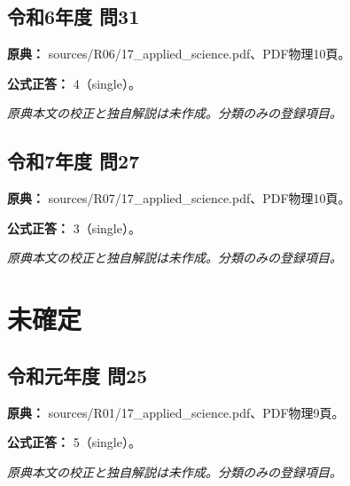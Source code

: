 \subsection{令和6年度 問31}
\label{q:r06-reg-applied-31}

\noindent\textbf{原典：} sources/R06/17\_applied\_science.pdf、PDF物理10頁。

\textbf{公式正答：} 4（single）。

\par\textit{原典本文の校正と独自解説は未作成。分類のみの登録項目。}

\subsection{令和7年度 問27}
\label{q:r07-reg-applied-27}

\noindent\textbf{原典：} sources/R07/17\_applied\_science.pdf、PDF物理10頁。

\textbf{公式正答：} 3（single）。

\par\textit{原典本文の校正と独自解説は未作成。分類のみの登録項目。}

\section{未確定}

\subsection{令和元年度 問25}
\label{q:r01-reg-applied-25}

\noindent\textbf{原典：} sources/R01/17\_applied\_science.pdf、PDF物理9頁。

\textbf{公式正答：} 5（single）。

\par\textit{原典本文の校正と独自解説は未作成。分類のみの登録項目。}
